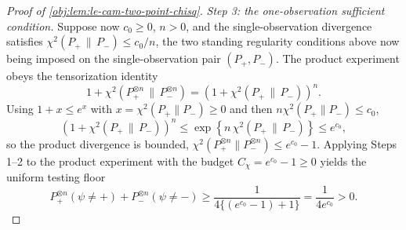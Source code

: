 \begin{proof}[Proof of \cref{obj:lem:le-cam-two-point-chisq}]
\emph{Step 3: the one-observation sufficient condition.}  Suppose now \(c_0\ge0\), \(n>0\), and the single-observation divergence satisfies \(\chi^2(P_+\,\|\,P_-)\le c_0/n\), the two standing regularity conditions above now being imposed on the single-observation pair \((P_+,P_-)\).  The product experiment obeys the tensorization identity
\[
1+\chi^2(P_+^{\otimes n}\,\|\,P_-^{\otimes n})
=
\left(1+\chi^2(P_+\,\|\,P_-)\right)^n .
\]
Using \(1+x\le e^x\) with \(x=\chi^2(P_+\|P_-)\ge0\) and then \(n\chi^2(P_+\|P_-)\le c_0\),
\[
\left(1+\chi^2(P_+\,\|\,P_-)\right)^n
\le
\exp\left\{n\,\chi^2(P_+\,\|\,P_-)\right\}
\le e^{c_0},
\]
so the product divergence is bounded, \(\chi^2(P_+^{\otimes n}\|P_-^{\otimes n})\le e^{c_0}-1\).  Applying Steps 1--2 to the product experiment with the budget \(C_\chi=e^{c_0}-1\ge0\) yields the uniform testing floor
\[
P_+^{\otimes n}(\psi\ne+)+P_-^{\otimes n}(\psi\ne-)
\ge
\frac{1}{4\{(e^{c_0}-1)+1\}}
=
\frac{1}{4e^{c_0}}
>0 .
\]
\end{proof}
